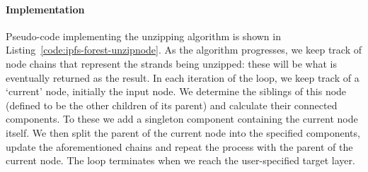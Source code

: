 \paragraph{Implementation}

Pseudo-code implementing the unzipping algorithm is shown in Listing~\ref{code:ipfs-forest-unzipnode}. As the algorithm progresses, we keep track of node chains that represent the strands being unzipped: these will be what is eventually returned as the result. In each iteration of the loop, we keep track of a `current' node, initially the input node. We determine the siblings of this node (defined to be the other children of its parent) and calculate their connected components. To these we add a singleton component containing the current node itself. We then split the parent of the current node into the specified components, update the aforementioned chains and repeat the process with the parent of the current node. The loop terminates when we reach the user-specified target layer.


